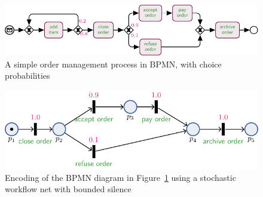 \begin{figure}[!t]
	\centering
	\includegraphics[width=\textwidth]{images/bpmn-order}
	\caption{A simple order management process in BPMN, with choice probabilities}\label{fig:bpmn-order}
\end{figure}
\begin{figure}[!t]
		\centering
	\includegraphics[width=\textwidth]{images/petri_tut}
	\caption{Encoding of the BPMN diagram in Figure~\ref{fig:bpmn-order} using a stochastic workflow net with bounded silence}\label{fig:petri_tut}
\end{figure}

%	
